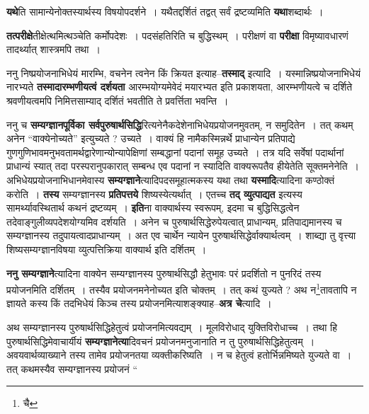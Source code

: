 \documentclass[article,12pt,a4paper]{memoir}
\begin{document}
	  \endgroup
	

	  \pstart \textbf{यथे}ति सामान्येनोक्तस्यार्थस्य विषयोपदर्शने । यथैतद्दर्शितं तद्वत् सर्वं द्रष्टव्यमिति \textbf{यथा}शब्दार्थः ।
	\pend
      

	  \pstart \textbf{तत्परीक्षे}तीक्षेत्थमित्थञ्चेति कर्मोपदेशः । पदसंहतिरिति च बुद्धिस्थम् । परीक्षणं वा \textbf{परीक्षा} विमृष्यावधारणं तादर्थ्यात् शास्त्रमपि तथा ।
	\pend
      

	  \pstart ननु निष्प्रयोजनाभिधेयं मारम्भि, वचनेन त्वनेन किं क्रियत इत्याह--\textbf{तस्माद्} इत्यादि । यस्मान्निष्प्रयोजनाभिधेयं नारभ्यते \textbf{तस्मादारम्भणीयत्वं दर्शयता} आरम्भयोग्यमेवेदं मयारभ्यत इति प्रकाशयता, आरम्भणीयत्वे च दर्शिते श्रवणीयत्वमपि निमित्तसाम्याद् दर्शितं भवतीति ते प्रवर्त्तिता भवन्ति ।
	\pend
      

	  \pstart ननु च \textbf{सम्यग्ज्ञानपूर्विका सर्वपुरुषार्थसिद्धि}रित्यनेनैकदेशेनाभिधेयप्रयोजनमुवतम्, न समुदितेन । तत् कथम् अनेन “वाक्येनोच्यते” इत्युच्यते ? उच्यते । वाक्यं हि नामैकस्मिन्नर्थे प्राधान्येन प्रतिपाद्ये गुणगुणिभावमनुभवतामर्थद्वारेणान्योन्यापेक्षिणां सम्बद्धानां पदानां समूह उच्यते । तत्र यदि सर्वेषां पदार्थानां प्राधान्यं स्यात् तदा परस्परानुपकारात् सम्बन्ध एव पदानां न स्यादिति वाक्यरूपतैव हीयेतेति सूक्तमनेनेति । अभिधेयप्रयोजनाभिधानमेवास्य \textbf{सम्यग्ज्ञाने}त्यादिपदसमूहात्मकस्य यथा तथा \textbf{यस्मादि}त्यादिना कण्ठोक्तं करोति । \textbf{तस्य} सम्यग्ज्ञानस्य \textbf{प्रतिपत्तये} शिष्यस्येत्यर्थात् । एतच्च \textbf{तद् व्युत्पाद्यत} इत्यस्य सामर्थ्यावस्थितार्थ कथनं द्रष्टव्यम् । \textbf{इति}ना वाक्यार्थस्य स्वरूपम्, इदमा च बुद्धिसिद्धत्वेन तदेवाङ्गुलीव्यपदेशयोग्यमिव दर्शयति । अनेन च पुरुषार्थसिद्धेरुपेयत्वात् प्राधान्यम्, प्रतिपाद्यमानस्य च सम्यग्ज्ञानस्य तदुपायत्वादप्राधान्यम् । अत एव चार्थेन न्यायेन पुरुषार्थसिद्धेर्वाक्यार्थत्वम् । शाब्द्या तु वृत्त्या शिष्यसम्यग्ज्ञानविषया व्युत्पत्तिक्रिया वाक्यार्थ इति दर्शितम् ।
	\pend
      

	  \pstart \textbf{ननु सम्यग्ज्ञाने}त्यादिना वाक्येन सम्यग्ज्ञानस्य पुरुषार्थसिद्धौ हेतुभावः परं प्रदर्शितो न पुनरिदं तस्य प्रयोजनमिति दर्शितम् । तस्यैव प्रयोजनमनेनोच्यत इति चोक्तम् । तत् कथं युज्यते ? अथ न\footnote{चै}\-तावतापि न ज्ञायते कस्य किं तदभिधेयं किञ्च तस्य प्रयोजनमित्याशङ्क्याह--\textbf{अत्र चे}त्यादि ।
	\pend
      

	  \pstart अथ सम्यग्ज्ञानस्य पुरुषार्थसिद्धिहेतुत्वं प्रयोजनमित्यवद्यम् । मूलविरोधाद् युक्तिविरोधाच्च । तथा हि पुरुषार्थसिद्धिमेवाचार्यीयं \textbf{सम्यग्ज्ञानेत्या}दिवचनं प्रयोजनमनुजानाति न तु पुरुषार्थसि\leavevmode{}द्धिहेतुत्वम् । अवयवार्थव्याख्याने तस्य तामेव प्रयोजनतया व्यक्तीकरिष्यति । न च हेतुत्वं हतोर्भिन्नमिष्यते युज्यते वा । तत् कथमस्यैव सम्यग्ज्ञानस्य प्रयोजनं  \leavevmode{} “
	  
\end{document}
